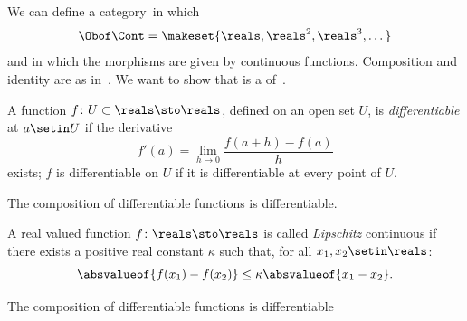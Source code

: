 {{\begin{definition}
    \end{definition}

    \begin{example}
        We can define a category~\Cont in which
        \begin{equation}
            \Obof\Cont=\makeset{\reals, \reals^2, \reals^3, \dots }
        \end{equation}
        and in which the morphisms are given by continuous functions.
        Composition and identity are as in~\Set.
        We want to show that \Cont is a  of~\Set.
    \end{example}


    \begin{definition}\label{def:differentiable}
        A function $f\colon U\subset \reals\sto \reals$, defined on an open set $U$, is \emph{differentiable} at $a\setin U$ if the derivative
        \begin{equation}
            f'(a)=\lim_{h\to 0} \frac{f(a+h)-f(a)}{h}
        \end{equation}
        exists; $f$ is differentiable on $U$ if it is differentiable at every point of $U$.
    \end{definition}

    \begin{example}
        The composition of differentiable functions is differentiable.
    \end{example}


    \begin{definition}\label{def:Lipschitz}
        A real valued function $f\colon \reals\sto \reals$ is called \emph{Lipschitz} continuous if there exists a positive real constant $\kappa$ such that, for all $x_1,x_2\setin \reals$:
        \begin{equation}
            \absvalueof{f(x_1)-f(x_2)} \leq \kappa \absvalueof{ x_1-x_2}.
        \end{equation}
    \end{definition}

    \begin{example}
        The composition of differentiable functions is differentiable
    \end{example}

}}
